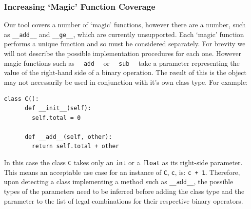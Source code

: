 \documentclass[12pt, titlepage]{article}
\begin{document}
\subsubsection*{Increasing `Magic' Function Coverage}
Our tool covers a number of `magic' functions, however there are a number, such as \texttt{\_\_add\_\_} and \texttt{\_\_ge\_\_}, which are currently unsupported. Each `magic' function performs a unique function and so must be considered separately. For brevity we will not describe the possible implementation procedures for each one. However magic functions such as \texttt{\_\_add\_\_} or \texttt{\_\_sub\_\_} take a parameter representing the value of the right-hand side of a binary operation. The result of this is the object may not necessarily be used in conjunction with it's own class type. For example:
\begin{lstlisting}[mathescape]
    class C():
      def __init__(self):
        self.total = 0
        
      def __add__(self, other):
        return self.total + other
\end{lstlisting}
In this case the class \texttt{C} takes only an \texttt{int} or a \texttt{float} as its right-side parameter. This means an acceptable use case for an instance of \texttt{C}, \texttt{c}, is: \texttt{c + 1}. Therefore, upon detecting a class implementing a method such as \texttt{\_\_add\_\_}, the possible types of the parameters need to be inferred before adding the class type and the parameter to the list of legal combinations for their respective binary operators.
\end{document}

